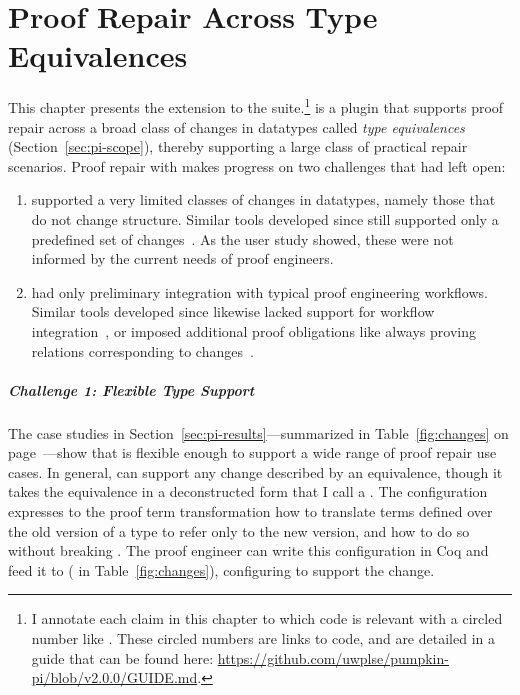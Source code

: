 \chapter{Proof Repair Across Type Equivalences}
\label{chapt:pi}


This chapter presents the \intro{\toolnamec} extension to the    suite.\footnote{I annotate each claim in this chapter to which code is relevant with a circled number like . These circled numbers are links to code, and are detailed in a guide that can be found here: \url{https://github.com/uwplse/pumpkin-pi/blob/v2.0.0/GUIDE.md}.}
\toolnamec is a plugin that supports proof repair across a broad class of changes in datatypes called 
\textit{type equivalences} (Section~\ref{sec:pi-scope}),
thereby supporting a large class of practical repair scenarios.
Proof repair  with \toolnamec makes progress on two challenges that  had left open:

\begin{enumerate}
\item \sysname supported a very limited classes of changes in datatypes, namely those that do not change structure.
Similar tools developed since still supported only a predefined set of changes~\cite{robert2018, wibergh2019}.
As the  user study showed, these were not informed by the current needs of proof engineers. %
\item \sysname had only preliminary integration with typical proof engineering workflows.
Similar tools developed since likewise lacked support for workflow integration~\cite{PGL-045, robert2018},
or imposed additional proof obligations like always proving relations corresponding to changes~\cite{tabareau2019marriage}.
\end{enumerate}

\paragraph{Challenge 1: Flexible Type Support}
The case studies in Section~\ref{sec:pi-results}---summarized in Table~\ref{fig:changes} on page~\pageref{fig:changes}---show that \toolnamec is flexible enough to support
a wide range of proof repair use cases. %
In general, \toolnamec can support any change described by an equivalence, though it takes the equivalence in a
deconstructed form that I call a .
The configuration expresses to the proof term transformation how to translate terms defined over the old version of a type
to refer only to the new version, and how to do so without breaking .
The proof engineer can write this configuration in Coq and feed it to \toolnamec ( in Table~\ref{fig:changes}),
configuring \toolnamec to support the change. %

